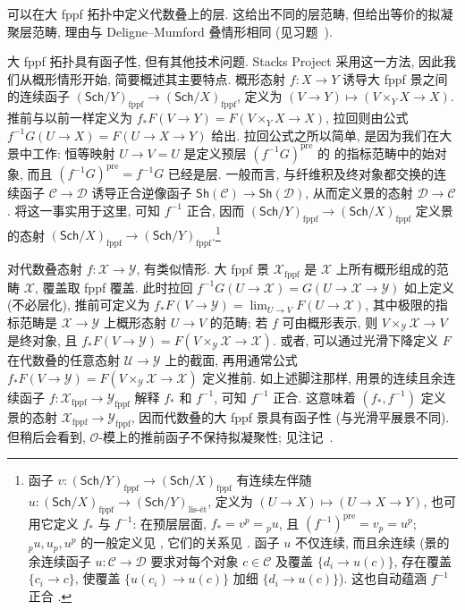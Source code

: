 \begin{remark}[大 fppf 拓扑]\label{src:7.1.6}
可以在大 fppf 拓扑中定义代数叠上的层. 这给出不同的层范畴, 但给出等价的拟凝聚层范畴, 理由与 Deligne--Mumford 叠情形相同 (见习题~).

大 fppf 拓扑具有函子性, 但有其他技术问题. Stacks Project 采用这一方法, 因此我们从概形情形开始, 简要概述其主要特点. 概形态射 $f:X\to Y$ 诱导大 fppf 景之间的连续函子 $(\mathsf{Sch}/Y)_{\mathrm{fppf}}\to(\mathsf{Sch}/X)_{\mathrm{fppf}}$, 定义为 $(V\to Y)\mapsto(V\times_Y X\to X)$. 推前与以前一样定义为 $f_*F(V\to Y)=F(V\times_Y X\to X)$, 拉回则由公式 $f^{-1}G(U\to X)=F(U\to X\to Y)$ 给出. 拉回公式之所以简单, 是因为我们在大景中工作: 恒等映射 $U\to V=U$ 是定义预层 $(f^{-1}G)^{\mathrm{pre}}$ 的  的指标范畴中的始对象, 而且 $(f^{-1}G)^{\mathrm{pre}}=f^{-1}G$ 已经是层. 一般而言, 与纤维积及终对象都交换的连续函子 $\mathcal C\to\mathcal D$ 诱导正合逆像函子 $\mathsf{Sh}(\mathcal C)\to\mathsf{Sh}(\mathcal D)$, 从而定义景的态射 $\mathcal D\to\mathcal C$ \cite[Tag 00X6]{SP}. 将这一事实用于这里, 可知 $f^{-1}$ 正合, 因而 $(\mathsf{Sch}/Y)_{\mathrm{fppf}}\to(\mathsf{Sch}/X)_{\mathrm{fppf}}$ 定义景的态射 $(\mathsf{Sch}/X)_{\mathrm{fppf}}\to(\mathsf{Sch}/Y)_{\mathrm{fppf}}$.\footnote{函子 $v:(\mathsf{Sch}/Y)_{\mathrm{fppf}}\to(\mathsf{Sch}/X)_{\mathrm{fppf}}$ 有连续左伴随 $u:(\mathsf{Sch}/X)_{\mathrm{fppf}}\to(\mathsf{Sch}/Y)_{\text{lis-ét}}$, 定义为 $(U\to X)\mapsto(U\to X\to Y)$, 也可用它定义 $f_*$ 与 $f^{-1}$: 在预层层面, $f_*=v^p={}_pu$, 且 $(f^{-1})^{\mathrm{pre}}=v_p=u^p$; ${}_pu,u_p,u^p$ 的一般定义见 \cite[Tags 00VC 与 00XF]{SP}, 它们的关系见 \cite[Tag 09VQ]{SP}. 函子 $u$ 不仅连续, 而且余连续 (景的余连续函子 $u:\mathcal C\to\mathcal D$ 要求对每个对象 $c\in\mathcal C$ 及覆盖 $\{d_i\to u(c)\}$, 存在覆盖 $\{c_i\to c\}$, 使覆盖 $\{u(c_i)\to u(c)\}$ 加细 $\{d_i\to u(c)\}$). 这也自动蕴涵 $f^{-1}$ 正合 \cite[Tag 06NW]{SP}.}

对代数叠态射 $f:\mathcal X\to\mathcal Y$, 有类似情形. 大 fppf 景 $\mathcal X_{\mathrm{fppf}}$ 是 $\mathcal X$ 上所有概形组成的范畴 $\mathcal X$, 覆盖取 fppf 覆盖. 此时拉回 $f^{-1}G(U\to\mathcal X)=G(U\to\mathcal X\to\mathcal Y)$ 如上定义 (不必层化), 推前可定义为 $f_*F(V\to\mathcal Y)=\lim_{U\to V}F(U\to\mathcal X)$, 其中极限的指标范畴是 $\mathcal X\to\mathcal Y$ 上概形态射 $U\to V$ 的范畴; 若 $f$ 可由概形表示, 则 $V\times_{\mathcal Y}\mathcal X\to V$ 是终对象, 且 $f_*F(V\to\mathcal Y)=F(V\times_{\mathcal Y}\mathcal X\to\mathcal X)$. 或者, 可以通过光滑下降定义 $F$ 在代数叠的任意态射 $\mathcal U\to\mathcal Y$ 上的截面, 再用通常公式 $f_*F(V\to\mathcal Y)=F(V\times_{\mathcal Y}\mathcal X\to\mathcal X)$ 定义推前. 如上述脚注那样, 用景的连续且余连续函子 $f:\mathcal X_{\mathrm{fppf}}\to\mathcal Y_{\mathrm{fppf}}$ 解释 $f_*$ 和 $f^{-1}$, 可知 $f^{-1}$ 正合. 这意味着 $(f_*,f^{-1})$ 定义景的态射 $\mathcal X_{\mathrm{fppf}}\to\mathcal Y_{\mathrm{fppf}}$, 因而代数叠的大 fppf 景具有函子性 (与光滑平展景不同). 但稍后会看到, $\mathcal O$-模上的推前函子不保持拟凝聚性; 见注记~.
\end{remark}
